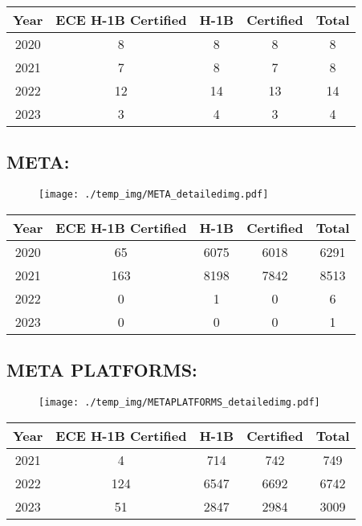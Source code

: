 \documentclass{article}%
\begin{document}
%
\begin{longtable}{c|c|c|c|c}%
\hline%
Year&ECE H{-}1B Certified&H{-}1B&Certified&Total\\%
\hline%
2020&8&8&8&8\\%
\hline%
2021&7&8&7&8\\%
\hline%
2022&12&14&13&14\\%
\hline%
2023&3&4&3&4\\%
\hline%
\end{longtable}

%
\newpage%
\subsection{META:}%
\label{subsec:META}%
\label{METAdetailed}%


\begin{figure}[htbp]%
\centering%
\texttt{[image: ./temp\_img/META\_detailedimg.pdf]}%
\end{figure}

%
\begin{longtable}{c|c|c|c|c}%
\hline%
Year&ECE H{-}1B Certified&H{-}1B&Certified&Total\\%
\hline%
2020&65&6075&6018&6291\\%
\hline%
2021&163&8198&7842&8513\\%
\hline%
2022&0&1&0&6\\%
\hline%
2023&0&0&0&1\\%
\hline%
\end{longtable}

%
\newpage%
\subsection{META PLATFORMS:}%
\label{subsec:METAPLATFORMS}%
\label{METAPLATFORMSdetailed}%


\begin{figure}[htbp]%
\centering%
\texttt{[image: ./temp\_img/METAPLATFORMS\_detailedimg.pdf]}%
\end{figure}

%
\begin{longtable}{c|c|c|c|c}%
\hline%
Year&ECE H{-}1B Certified&H{-}1B&Certified&Total\\%
\hline%
2021&4&714&742&749\\%
\hline%
2022&124&6547&6692&6742\\%
\hline%
2023&51&2847&2984&3009\\%
\hline%
\end{longtable}
\end{document}
